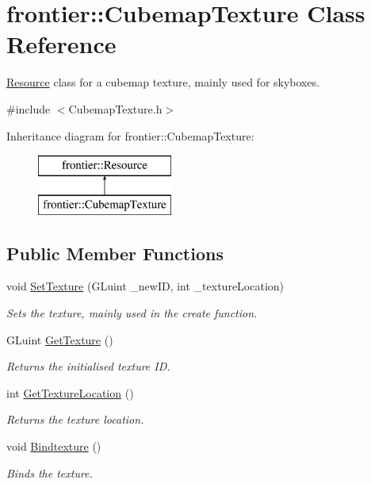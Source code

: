 \hypertarget{classfrontier_1_1_cubemap_texture}{}\section{frontier\+:\+:Cubemap\+Texture Class Reference}
\label{classfrontier_1_1_cubemap_texture}


\hyperlink{classfrontier_1_1_resource}{Resource} class for a cubemap texture, mainly used for skyboxes.  




{\ttfamily \#include $<$Cubemap\+Texture.\+h$>$}

Inheritance diagram for frontier\+:\+:Cubemap\+Texture\+:\begin{figure}[H]
\begin{center}
\leavevmode
\includegraphics[height=2.000000cm]{classfrontier_1_1_cubemap_texture}
\end{center}
\end{figure}
\subsection*{Public Member Functions}
\begin{DoxyCompactItemize}
\item 
void \hyperlink{classfrontier_1_1_cubemap_texture_aec96f85e22f9bc68815721f437d6df7f}{Set\+Texture} (G\+Luint \+\_\+new\+ID, int \+\_\+texture\+Location)
\begin{DoxyCompactList}\small\item\em Sets the texture, mainly used in the create function. \end{DoxyCompactList}\item 
G\+Luint \hyperlink{classfrontier_1_1_cubemap_texture_a18b6320619de29cad6acd5fe50c42439}{Get\+Texture} ()
\begin{DoxyCompactList}\small\item\em Returns the initialised texture ID. \end{DoxyCompactList}\item 
int \hyperlink{classfrontier_1_1_cubemap_texture_a091f7bd4e5233e5ce5f034ca17588387}{Get\+Texture\+Location} ()
\begin{DoxyCompactList}\small\item\em Returns the texture location. \end{DoxyCompactList}\item 
void \hyperlink{classfrontier_1_1_cubemap_texture_aeddd79b5a1e438b532baf79be95452c7}{Bindtexture} ()
\begin{DoxyCompactList}\small\item\em Binds the texture. \end{DoxyCompactList}\end{DoxyCompactItemize}
